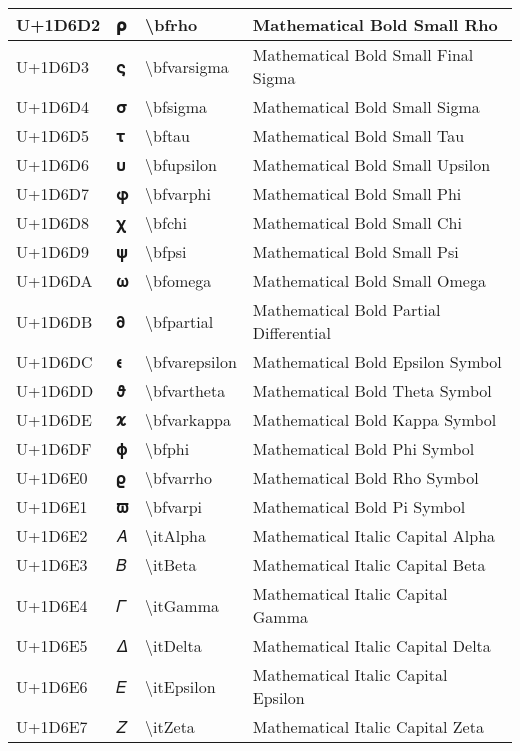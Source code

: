 \begin{table}[h]
\begin{tabulary}{\linewidth}{|L|L|L|L|}
\hline
U+1D6D2 & 𝛒 & {\textbackslash}bfrho & Mathematical Bold Small Rho \\
\hline
U+1D6D3 & 𝛓 & {\textbackslash}bfvarsigma & Mathematical Bold Small Final Sigma \\
\hline
U+1D6D4 & 𝛔 & {\textbackslash}bfsigma & Mathematical Bold Small Sigma \\
\hline
U+1D6D5 & 𝛕 & {\textbackslash}bftau & Mathematical Bold Small Tau \\
\hline
U+1D6D6 & 𝛖 & {\textbackslash}bfupsilon & Mathematical Bold Small Upsilon \\
\hline
U+1D6D7 & 𝛗 & {\textbackslash}bfvarphi & Mathematical Bold Small Phi \\
\hline
U+1D6D8 & 𝛘 & {\textbackslash}bfchi & Mathematical Bold Small Chi \\
\hline
U+1D6D9 & 𝛙 & {\textbackslash}bfpsi & Mathematical Bold Small Psi \\
\hline
U+1D6DA & 𝛚 & {\textbackslash}bfomega & Mathematical Bold Small Omega \\
\hline
U+1D6DB & 𝛛 & {\textbackslash}bfpartial & Mathematical Bold Partial Differential \\
\hline
U+1D6DC & 𝛜 & {\textbackslash}bfvarepsilon & Mathematical Bold Epsilon Symbol \\
\hline
U+1D6DD & 𝛝 & {\textbackslash}bfvartheta & Mathematical Bold Theta Symbol \\
\hline
U+1D6DE & 𝛞 & {\textbackslash}bfvarkappa & Mathematical Bold Kappa Symbol \\
\hline
U+1D6DF & 𝛟 & {\textbackslash}bfphi & Mathematical Bold Phi Symbol \\
\hline
U+1D6E0 & 𝛠 & {\textbackslash}bfvarrho & Mathematical Bold Rho Symbol \\
\hline
U+1D6E1 & 𝛡 & {\textbackslash}bfvarpi & Mathematical Bold Pi Symbol \\
\hline
U+1D6E2 & 𝛢 & {\textbackslash}itAlpha & Mathematical Italic Capital Alpha \\
\hline
U+1D6E3 & 𝛣 & {\textbackslash}itBeta & Mathematical Italic Capital Beta \\
\hline
U+1D6E4 & 𝛤 & {\textbackslash}itGamma & Mathematical Italic Capital Gamma \\
\hline
U+1D6E5 & 𝛥 & {\textbackslash}itDelta & Mathematical Italic Capital Delta \\
\hline
U+1D6E6 & 𝛦 & {\textbackslash}itEpsilon & Mathematical Italic Capital Epsilon \\
\hline
U+1D6E7 & 𝛧 & {\textbackslash}itZeta & Mathematical Italic Capital Zeta \\

\end{tabulary}
\end{table}
